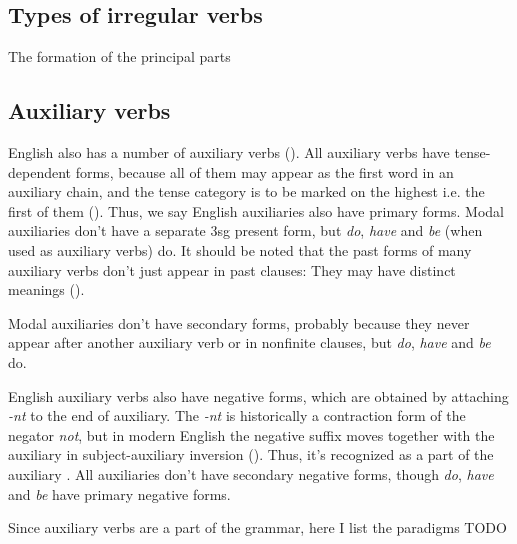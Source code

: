 \documentclass[UTF8, a4paper, oneside, scheme=plain]{ctexrep}
\newcommand*{\citepage}[1]{pp.~{#1}}
\newcommand{\corpus}[1]{\emph{#1}}
\begin{document}
\subsection{Types of irregular verbs}

The formation of the principal parts 

\subsection{Auxiliary verbs}\label{sec:verb-inflection.auxiliary}

English also has a number of auxiliary verbs ().
All auxiliary verbs have tense-dependent forms,
because all of them may appear as the first word in an auxiliary chain,
and the tense category is to be marked on the highest i.e. the first of them ().
Thus, we say English auxiliaries also have primary forms.
Modal auxiliaries don't have a separate 3sg present form,
but \corpus{do}, \corpus{have} and \corpus{be} (when used as auxiliary verbs) do.
It should be noted that the past forms of many auxiliary verbs don't just appear in past clauses:
They may have distinct meanings ().

Modal auxiliaries don't have secondary forms,
probably because they never appear after another auxiliary verb 
or in nonfinite clauses,
but \corpus{do}, \corpus{have} and \corpus{be} do.

English auxiliary verbs also have negative forms,
which are obtained by attaching \corpus{-nt} to the end of auxiliary.
The \corpus{-nt} is historically a contraction form of the negator \corpus{not},
but in modern English the negative suffix moves together with the auxiliary in
subject-auxiliary inversion ().
Thus, it's recognized as a part of the auxiliary \citep[\citepage{91}]{cgel}.
All auxiliaries don't have secondary negative forms,
though \corpus{do}, \corpus{have} and \corpus{be} have primary negative forms.

Since auxiliary verbs are a part of the grammar,
here I list the paradigms TODO
\end{document}
